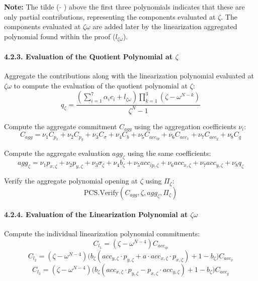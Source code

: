 \documentclass[
]{article}
\begin{document}
\textbf{Note:} The tilde ( \(\tilde{}\) ) above the first three
polynomials indicates that these are only partial contributions,
representing the components evaluated at \(\zeta\). The components
evaluated at \(\zeta \omega\) are added later by the linearization
aggregated polynomial found within the proof (\(l_{\zeta\omega}\)).

\paragraph{\texorpdfstring{4.2.3. Evaluation of the Quotient Polynomial
at
\(\zeta\)}{4.2.3. Evaluation of the Quotient Polynomial at \textbackslash zeta}}\label{evaluation-of-the-quotient-polynomial-at-zeta}

Aggregate the contributions along with the linearization polynomial
evaluated at \(\zeta \omega\) to compute the evaluation of the quotient
polynomial at \(\zeta\):
\[q_{\zeta}=\frac{(\sum_{i=1}^7\alpha_ic_i+l_{\zeta\omega})\prod_{k=1}^3(\zeta-\omega^{N-k})}{\zeta^N-1}\]

Compute the aggregate commitment \(C_{agg}\) using the aggregation
coefficients \(\nu_i\):
\[C_{agg} = \nu_1 C_{p_x} + \nu_2 C_{p_y} + \nu_3 C_\sigma + \nu_4 C_b + \nu_5 C_{acc_{ip}} + \nu_6 C_{acc_x} + \nu_7 C_{acc_y} + \nu_8 C_q\]

Compute the aggregate evaluation \(agg_\zeta\) using the same
coefficients:
\[agg_\zeta = \nu_1 p_{x,\zeta} + \nu_2 p_{y,\zeta} + \nu_3 \sigma_\zeta + \nu_4 b_\zeta + \nu_5 acc_{ip,\zeta} + \nu_6 acc_{x,\zeta} + \nu_7 acc_{y,\zeta} + \nu_8 q_\zeta\]

Verify the aggregate polynomial opening at \(\zeta\) using
\(\Pi_\zeta\):
\[\text{PCS.Verify}(C_{agg}, \zeta, agg_\zeta, \Pi_\zeta)\]

\paragraph{\texorpdfstring{4.2.4. Evaluation of the Linearization
Polynomial at
\(\zeta \omega\)}{4.2.4. Evaluation of the Linearization Polynomial at \textbackslash zeta \textbackslash omega}}\label{evaluation-of-the-linearization-polynomial-at-zeta-omega}

Compute the individual linearization polynomial commitments:
\[C_{l_1}=(\zeta-\omega^{N-4})C_{acc_{ip}}\]
\[C_{l_2}=(\zeta-\omega^{N-4})\bigl(b_\zeta(acc_{y,\zeta} \cdot p_{y,\zeta}+a \cdot acc_{x,\zeta} \cdot p_{x,\zeta})+1-b_\zeta\bigr)C_{acc_x}\]
\[C_{l_3}=(\zeta-\omega^{N-4})\bigl(b_\zeta(acc_{x,\zeta} \cdot p_{y,\zeta}-p_{x,\zeta} \cdot acc_{y,\zeta})+1-b_\zeta\bigr)C_{acc_y}\]
\end{document}
